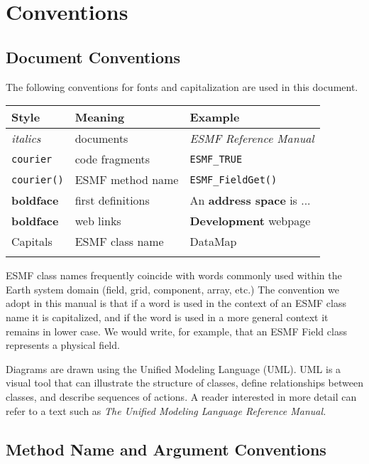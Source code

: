 \section{Conventions}
\label{sec:conventions}

\subsection{Document Conventions}

The following conventions for fonts and capitalization are used
in this document. \newline

\begin{tabular}{lll}
{\bf Style} & {\bf Meaning} & {\bf Example} \\ \hline
{\it italics}  & documents & {\it ESMF Reference Manual}\\
{\tt courier}  & code fragments & {\tt ESMF\_TRUE}\\
{\tt courier()}  & ESMF method name & {\tt ESMF\_FieldGet()} \\
{\bf boldface} & first definitions & An {\bf address space} is ...\\
{\bf boldface} & web links & {\bf Development} webpage \\
{Capitals}     & ESMF class name & DataMap \\ \\
\end{tabular} 
 
ESMF class names frequently coincide with words commonly
used within the Earth system domain (field, grid, component, array, 
etc.)  The convention we adopt in this manual is that if a word is 
used in the context of an ESMF class name it is capitalized, and 
if the word is used in a more general context it remains in lower 
case.  We would write, for example, that an ESMF Field class 
represents a physical field.  

Diagrams are drawn using the Unified Modeling Language (UML).  UML 
is a visual tool that can illustrate the structure of 
classes, define relationships between classes, and describe sequences
of actions.  A reader interested in more detail can refer to a 
text such as {\it The Unified Modeling Language Reference Manual.}
 \cite{uml}

\subsection{Method Name and Argument Conventions}

